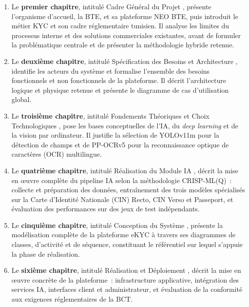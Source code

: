 \documentclass[12pt,a4paper]{report}
\begin{document}
\begin{enumerate}[leftmargin=2em, label=\textbf{\arabic*.}]

  \item Le \textbf{premier chapitre}, intitulé \og Cadre Général du Projet \fg{}, présente l'organisme d'accueil, la BTE, et sa plateforme NEO BTE, puis introduit le métier KYC et son cadre réglementaire tunisien. Il analyse les limites du processus interne et des solutions commerciales existantes, avant de formuler la problématique centrale et de présenter la méthodologie hybride retenue.

  \item Le \textbf{deuxième chapitre}, intitulé \og Spécification des Besoins et Architecture \fg{}, identifie les acteurs du système et formalise l'ensemble des besoins fonctionnels et non fonctionnels de la plateforme. Il décrit l'architecture logique et physique retenue et présente le diagramme de cas d'utilisation global.

  \item Le \textbf{troisième chapitre}, intitulé \og Fondements Théoriques et Choix Technologiques \fg{}, pose les bases conceptuelles de l'IA, du \textit{deep learning} et de la vision par ordinateur. Il justifie la sélection de YOLOv11m pour la détection de champs et de PP-OCRv5 pour la reconnaissance optique de caractères (OCR) multilingue.

  \item Le \textbf{quatrième chapitre}, intitulé \og Réalisation du Module IA \fg{}, décrit la mise en œuvre complète du pipeline IA selon la méthodologie CRISP-ML(Q)~: collecte et préparation des données, entraînement des trois modèles spécialisés sur la Carte d'Identité Nationale (CIN) Recto, CIN Verso et Passeport, et évaluation des performances sur des jeux de test indépendants.

  \item Le \textbf{cinquième chapitre}, intitulé \og Conception du Système \fg{}, présente la modélisation complète de la plateforme eKYC à travers ses diagrammes de classes, d'activité et de séquence, constituant le référentiel sur lequel s'appuie la phase de réalisation.

  \item Le \textbf{sixième chapitre}, intitulé \og Réalisation et Déploiement \fg{}, décrit la mise en œuvre concrète de la plateforme~: infrastructure applicative, intégration des services IA, interfaces client et administrateur, et évaluation de la conformité aux exigences réglementaires de la BCT.

\end{enumerate}
\end{document}
